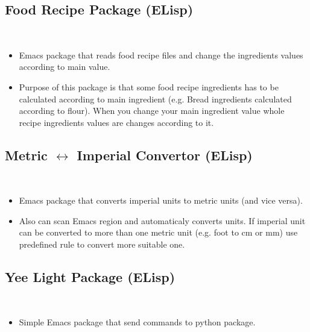 {	\subsection{Food Recipe Package (ELisp)} \label{lisp:frp} \hfill \\
	\begin{itemize}
		\item Emacs package that reads food recipe files and change the ingredients
		values according to main value.
		\item Purpose of this package is that some food recipe ingredients has to be
		calculated according to main ingredient
		(e.g. Bread ingredients calculated according to flour). When you change your
		main ingredient value whole recipe ingredients values are changes according
		to it.
	\end{itemize}


	\subsection{Metric $\longleftrightarrow$ Imperial Convertor (ELisp)} \hfill \\
	\begin{itemize}
		\item Emacs package that converts imperial units to metric units
		(and vice versa).
		\item Also can scan Emacs region and automaticaly converts units. If imperial
		unit can be converted to more than one metric unit (e.g. foot to cm or mm)
		use predefined rule to convert more suitable one.
	\end{itemize}


	\subsection{Yee Light Package (ELisp)} \hfill \\
	\begin{itemize}
		\item Simple Emacs package that send commands to  python
		package.
	\end{itemize}

}
